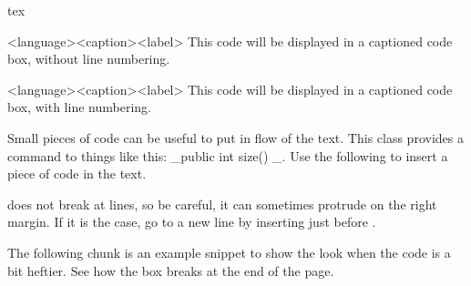 \begin{codebox}{tex}
    \begin{snippet}{<language>}{<caption>}{<label>}
        This code will be displayed in a captioned code box, without line numbering.
    \end{snippet}

    \begin{snippetnum}{<language>}{<caption>}{<label>}
        This code will be displayed in a captioned code box, with line numbering.
    \end{snippetnum}
\end{codebox}

Small pieces of code can be useful to put in flow of the text. This class provides a command to things like this: _public int size() {}_. Use the following to insert a piece of code in the text.



 does not break at lines, so be careful, it can sometimes protrude on the right margin. If it is the case, go to a new line by inserting  just before .


The following chunk is an example snippet to show the look when the code is a bit heftier. See how the box breaks at the end of the page.

